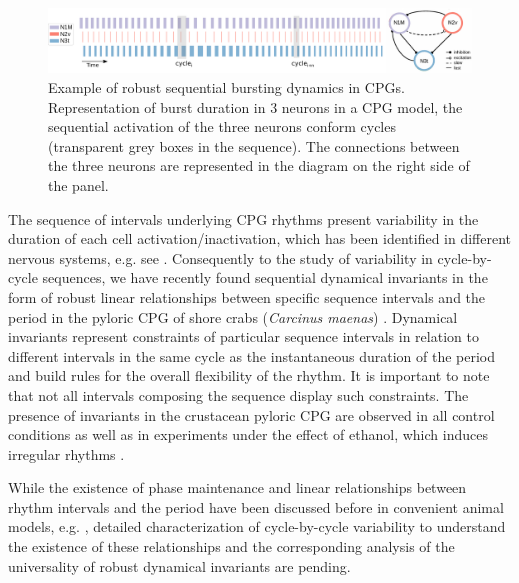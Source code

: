 \begin{figure}
	\includegraphics[width=\textwidth]{img/invariants/variability/sequences_in_cpgs.pdf}
	\caption{Example of robust sequential bursting dynamics in CPGs. Representation of burst duration in 3 neurons in a CPG model, the sequential activation of the three neurons conform cycles (transparent grey boxes in the sequence). The connections between the three neurons are represented in the diagram on the right side of the panel.}
	\label{fig:sequences_in_cpgs}
	
\end{figure}


The sequence of intervals underlying CPG rhythms present variability in the duration of each cell activation/inactivation, which has been identified in different nervous systems, e.g. see \cite{reyes_artificial_2008,elliott_temporal_1991,martinez_short-term_2019}. Consequently to the study of variability in cycle-by-cycle sequences, we have recently found sequential dynamical invariants in the form of robust linear relationships between specific sequence intervals and the period in the pyloric CPG of shore crabs (\textit{Carcinus maenas}) \cite{elices_robust_2019}. Dynamical invariants represent constraints of particular sequence intervals in relation to different intervals in the same cycle as the instantaneous duration of the period and build rules for the overall flexibility of the rhythm. It is important to note that not all intervals composing the sequence display such constraints. The presence of invariants in the crustacean pyloric CPG are observed in all control conditions as well as in experiments under the effect of ethanol, which induces irregular rhythms \cite{elices_robust_2019}. 



While the existence of phase maintenance and linear relationships between rhythm intervals and the period have been discussed before in convenient animal models, e.g. \cite{grillner_generation_1976,hooper_phase_1997,vavoulis_dynamic_2007}, detailed characterization of cycle-by-cycle variability to understand the existence of these relationships and the corresponding analysis of the universality of robust dynamical invariants are pending.

